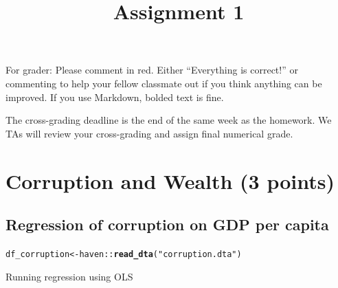 \documentclass{article}\usepackage[]{graphicx}\usepackage[]{color}
\title{Assignment 1}
\makeatletter
\newcommand{\hlstr}[1]{\textcolor[rgb]{0.192,0.494,0.8}{#1}}%
\newcommand{\hlopt}[1]{\textcolor[rgb]{0,0,0}{#1}}%
\newcommand{\hlstd}[1]{\textcolor[rgb]{0.345,0.345,0.345}{#1}}%
\newcommand{\hlkwb}[1]{\textcolor[rgb]{0.69,0.353,0.396}{#1}}%
\newcommand{\hlkwd}[1]{\textcolor[rgb]{0.737,0.353,0.396}{\textbf{#1}}}%
\newenvironment{kframe}{%
 \def\at@end@of@kframe{}%
 \ifinner\ifhmode%
  \def\at@end@of@kframe{\end{minipage}}%
  \begin{minipage}{\columnwidth}%
 \fi\fi%
 \def\FrameCommand##1{\hskip\@totalleftmargin \hskip-\fboxsep
 \colorbox{shadecolor}{##1}\hskip-\fboxsep
     \hskip-\linewidth \hskip-\@totalleftmargin \hskip\columnwidth}%
 \MakeFramed {\advance\hsize-\width
   \@totalleftmargin\z@ \linewidth\hsize
   \@setminipage}}%
 {\par\unskip\endMakeFramed%
 \at@end@of@kframe}
\newenvironment{knitrout}{}{} %
\makeatother
\begin{document}
\maketitle

{\color{red}For grader: Please comment in red. Either ``Everything is correct!'' or commenting to help your fellow classmate out if you think anything can be improved. If you use Markdown, bolded text is fine.

The cross-grading deadline is the end of the same week as the homework. We TAs will review your cross-grading and assign final numerical grade.}




\section*{Corruption and Wealth (3 points)}

\subsection*{Regression of corruption on GDP per capita}

\begin{knitrout}
\color{fgcolor}\begin{kframe}
\begin{alltt}
\hlstd{df_corruption} \hlkwb{<-} \hlstd{haven}\hlopt{::}\hlkwd{read_dta}\hlstd{(}\hlstr{"corruption.dta"}\hlstd{)}
\end{alltt}
\end{kframe}
\end{knitrout}

Running regression using OLS
\end{document}
